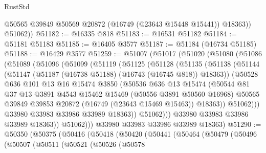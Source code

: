 \begin{lexlean}{RustStd}
\begin{coremodule}
            @50565
            @39849
            @50569
            @20872
            (@16749 (@23643 @15448 @15441))
            @18363))
        @51062))
@51182 := @16335 @818
@51183 := @16531 @51182
@51184 := @51181 @51183
@51185 := @16405 @3577
@51187 := @51184 (@16734 @51185)
@51188 := @16429 @3577
@51259 := @51007
    (@51017
      (@51020
        (@51080
          (@51086
            (@51089
              (@51096
                (@51099
                  (@51119
                    (@51125
                      (@51128
                        (@51135
                          (@51138
                            (@51144
                              (@51147 (@51187 (@16738 @51188) (@16743 (@16745 @818)) @18363))
                              (@50528
                                @636
                                @101
                                @13
                                @16
                                @15474
                                @3850
                                (@50536
                                  @636
                                  @13
                                  @15474
                                  (@50544
                                    @81
                                    @37
                                    @13
                                    @3891
                                    @4543
                                    @15462
                                    @15469
                                    (@50556 @3891 @50560 @16968)
                                    @50565
                                    @39849
                                    @39853
                                    @20872
                                    (@16749 (@23643 @15469 @15463))
                                    @18363))
                                @51062)))
                          @33980
                          @33983
                          @33986
                          @33989
                          @18363))
                      @51062)))
                @33980
                @33983
                @33986
                @33989
                @18363))
            @51062)))
      @33980
      @33983
      @33986
      @33989
      @18363)
@51290 := @50350
    (@50375
      (@50416
        (@50418
          (@50420
            (@50441
              (@50464
                (@50479
                  (@50496
                    (@50507
                      (@50511
                        (@50521
                          (@50526
                            (@50578

\end{coremodule}
\end{lexlean}
